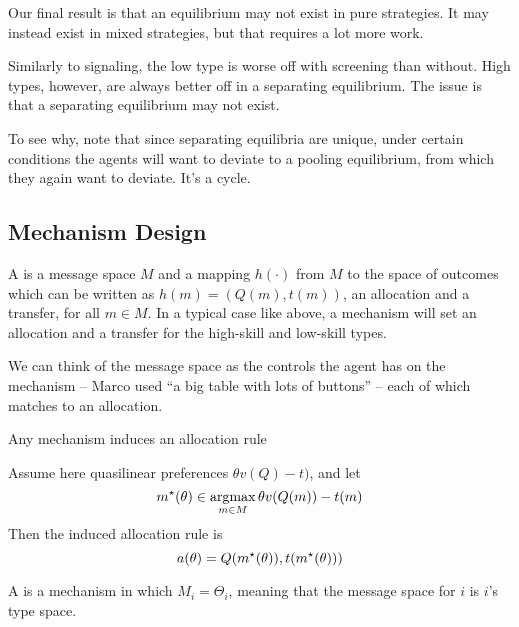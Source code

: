\documentclass[12pt]{article}
\begin{document}
Our final result is that an equilibrium may not exist in pure strategies. It may instead exist in mixed strategies, but that requires a lot more work. 

Similarly to signaling, the low type is worse off with screening than without. High types, however, are always better off in a separating equilibrium. The issue is that a separating equilibrium may not exist.

\begin{remark}
	To see why, note that since separating equilibria are unique, under certain conditions the agents will want to deviate to a pooling equilibrium, from which they again want to deviate. It's a cycle.
\end{remark}


\subsection{Mechanism Design}

\begin{definition}
	A  is a message space $M$ and a mapping $h(\cdot)$ from $M$ to the space of outcomes which can be written as $h(m) = (Q(m),t(m))$, an allocation and a transfer, for all $m \in M$. In a typical case like above, a mechanism will set an allocation and a transfer for the high-skill and low-skill types.
\end{definition}

\begin{remark}
	We can think of the message space as the controls the agent has on the mechanism -- Marco used ``a big table with lots of buttons'' -- each of which matches to an allocation.
\end{remark}

\begin{proposition}
	Any mechanism induces an allocation rule
\end{proposition}

\begin{example}
	Assume here quasilinear preferences $\theta v(Q) - t)$, and let
	\[
	m^\star(\theta) \in \mathop{\rm argmax}_{m \in M} \theta v(Q(m)) - t(m)
	\]
	Then the induced allocation rule is
	\[
	a(\theta) = Q(m^\star(\theta)),t(m^\star(\theta)))
	\]
\end{example}

\begin{definition}
	A  is a mechanism in which $M_i = \Theta_i$, meaning that the message space for $i$ is $i$'s type space.
\end{definition}
\end{document}
